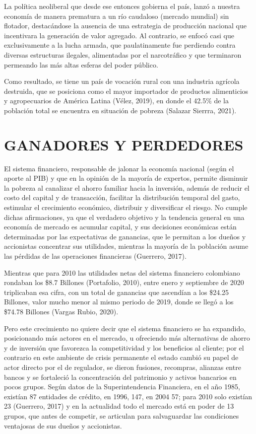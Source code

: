 \documentclass[
]{book}
\begin{document}
La política neoliberal que desde ese entonces gobierna el país, lanzó a nuestra economía de manera prematura a un río caudaloso (mercado mundial) sin flotador, destacándose la ausencia de una estrategia de producción nacional que incentivara la generación de valor agregado. Al contrario, se enfocó casi que exclusivamente a la lucha armada, que paulatinamente fue perdiendo contra diversas estructuras ilegales, alimentadas por el narcotráfico y que terminaron permeando las más altas esferas del poder público.

Como resultado, se tiene un país de vocación rural con una industria agrícola destruida, que se posiciona como el mayor importador de productos alimenticios y agropecuarios de América Latina (Vélez, 2019), en donde el 42.5\% de la población total se encuentra en situación de pobreza (Salazar Sierrra, 2021).

\hypertarget{ganadores-y-perdedores}{%
\chapter{GANADORES Y PERDEDORES}\label{ganadores-y-perdedores}}

El sistema financiero, responsable de jalonar la economía nacional (según el aporte al PIB) y que en la opinión de la mayoría de expertos, permite disminuir la pobreza al canalizar el ahorro familiar hacia la inversión, además de reducir el costo del capital y de transacción, facilitar la distribución temporal del gasto, estimular el crecimiento económico, distribuir y diversificar el riesgo. No cumple dichas afirmaciones, ya que el verdadero objetivo y la tendencia general en una economía de mercado es acumular capital, y sus decisiones económicas están determinadas por las expectativas de ganancias, que le permitan a los dueños y accionistas concentrar sus utilidades, mientras la mayoría de la población asume las pérdidas de las operaciones financieras (Guerrero, 2017).

Mientras que para 2010 las utilidades netas del sistema financiero colombiano rondaban los \$8.7 Billones (Portafolio, 2010), entre enero y septiembre de 2020 triplicaban esa cifra, con un total de ganancias que ascendían a los \$24.25 Billones, valor mucho menor al mismo periodo de 2019, donde se llegó a los \$74.78 Billones (Vargas Rubio, 2020).

Pero este crecimiento no quiere decir que el sistema financiero se ha expandido, posicionando más actores en el mercado, u ofreciendo más alternativas de ahorro y de inversión que favorezca la competitividad y los beneficios al cliente; por el contrario en este ambiente de crisis permanente el estado cambió su papel de actor directo por el de regulador, se dieron fusiones, recompras, alianzas entre bancos y se fortaleció la concentración del patrimonio y activos bancarios en pocos grupos. Según datos de la Superintendencia Financiera, en el año 1985, existían 87 entidades de crédito, en 1996, 147, en 2004 57; para 2010 solo existían 23 (Guerrero, 2017) y en la actualidad todo el mercado está en poder de 13 grupos, que antes de competir, se articulan para salvaguardar las condiciones ventajosas de sus dueños y accionistas.
\end{document}
